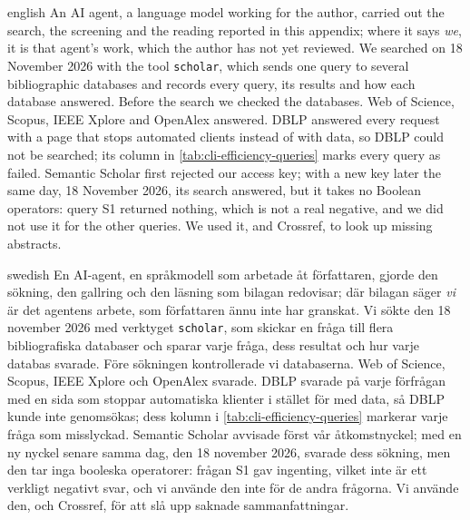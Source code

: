 \section{} %
\label{sec:cli-efficiency-method}

\begin{onlyin}{english} %
An AI agent, a language model working for the author, carried out the
search, the screening and the reading reported in this appendix; where
it says \emph{we}, it is that agent's work, which the author has not yet
reviewed.
We searched on 18 November 2026 with the tool \texttt{scholar}, which
sends one query to several bibliographic databases and records every
query, its results and how each database answered.  Before the search
we checked the databases.  Web of Science, Scopus, IEEE Xplore and
OpenAlex answered.  DBLP answered every request with a page that stops
automated clients instead of with data, so DBLP could not be searched;
its column in \cref{tab:cli-efficiency-queries} marks every query as
failed.  Semantic Scholar first rejected our access key; with a new
key later the same day, 18 November 2026, its search answered, but it
takes no Boolean operators: query S1 returned nothing, which is not a
real negative, and we did not use it for the other queries.  We used
it, and Crossref, to look up missing abstracts.
\end{onlyin}
\begin{onlyin}{swedish}
En AI-agent, en språkmodell som arbetade åt författaren, gjorde den
sökning, den gallring och den läsning som bilagan redovisar; där bilagan
säger \emph{vi} är det agentens arbete, som författaren ännu inte har
granskat.
Vi sökte den 18 november 2026 med verktyget \texttt{scholar}, som
skickar en fråga till flera bibliografiska databaser och sparar varje
fråga, dess resultat och hur varje databas svarade.  Före sökningen
kontrollerade vi databaserna.  Web of Science, Scopus, IEEE Xplore och
OpenAlex svarade.  DBLP svarade på varje förfrågan med en sida som
stoppar automatiska klienter i stället för med data, så DBLP kunde inte
genomsökas; dess kolumn i \cref{tab:cli-efficiency-queries} markerar
varje fråga som misslyckad.  Semantic Scholar avvisade först vår
åtkomstnyckel; med en ny nyckel senare samma dag, den 18 november 2026,
svarade dess sökning, men den tar inga booleska operatorer: frågan S1
gav ingenting, vilket inte är ett verkligt negativt svar, och vi använde
den inte för de andra frågorna.  Vi använde den, och Crossref, för att
slå upp saknade sammanfattningar.
\end{onlyin}

